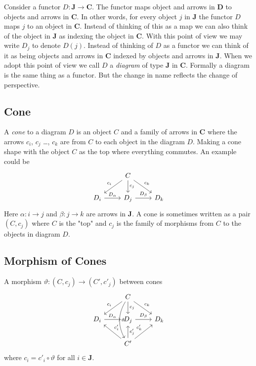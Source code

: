 \documentclass{book}
\theoremstyle{definition}
\begin{document}
Consider a functor $D : \textbf{J} \to \textbf{C}$. The functor maps object and
arrows in \textbf{D} to objects and arrows in \textbf{C}. In other words, for
every object $j$ in \textbf{J} the functor $D$ maps $j$ to an object in
\textbf{C}. Instead of thinking of this as a map we can also think of the object
in \textbf{J} as indexing the object in \textbf{C}. With this point of view we
may write $D_{j}$ to denote $D(j)$. Instead of thinking of $D$ as a functor we
can think of it as being objects and arrows in \textbf{C} indexed by objects and
arrows in \textbf{J}. When we adopt this point of view we call $D$ a
\emph{diagram} of type \textbf{J} in \textbf{C}. Formally a diagram is the same
thing as a functor. But the change in name reflects the change of perspective.

\subsection{Cone}

A \emph{cone} to a diagram $D$ is an object $C$ and a family of arrows in
\textbf{C} where the arrows $c_i$, $c_j$ \dots, $c_k$ are from $C$ to each
object in the diagram $D$. Making a cone shape with the object $C$ as the top
where everything commutes. An example could be
\[
\begin{tikzcd}
  & C \arrow[dl, "c_i"'] \arrow[d, "c_j"] \arrow[dr, "c_k"]  \\
  D_i \arrow[r,"D_\alpha"] & D_j \arrow[r, "D_\beta"]  & D_k
\end{tikzcd}
\]
Here $\alpha : i \to j$ and $\beta : j \to k$ are arrows in \textbf{J}. A cone is sometimes
written as a pair $(C, c_j)$ where $C$ is the "top" and $c_j$ is the family of
morphisms from $C$ to the objects in diagram $D$.

\subsection{Morphism of Cones}

A morphism $\vartheta : (C, c_j) \to (C', c'_j)$ between cones
\[
\begin{tikzcd}
  & C \arrow[dl, "c_i"'] \arrow[d, "c_j"] \arrow[dr, "c_k"] \arrow[dd, "\vartheta", bend right] \\
  D_i \arrow[r,"D_\alpha"] & D_j \arrow[r, "D_\beta"]  & D_k \\
  & C' \arrow[ul, "c'_i"'] \arrow[u, "c'_j"'] \arrow[ur, "c'_k"]
\end{tikzcd}
\]
where $c_i = c'_i \circ \vartheta$ for all $i \in \textbf{J}$.
\end{document}
